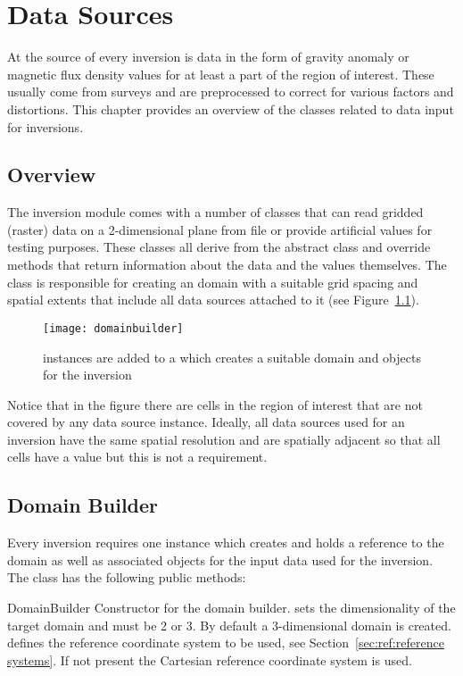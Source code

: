 \chapter{Data Sources}\label{Chp:ref:data sources}

At the source of every inversion is data in the form of gravity anomaly or
magnetic flux density values for at least a part of the region of interest.
These usually come from surveys and are preprocessed to correct for various
factors and distortions.
This chapter provides an overview of the classes related to data input for
inversions.

\section{Overview}
The inversion module comes with a number of classes that can read gridded
(raster) data on a 2-dimensional plane from file or provide artificial values
for testing purposes. These classes all derive from the abstract
 class and override methods that return information about
the data and the values themselves.
The  class is responsible for creating an \escript domain
with a suitable grid spacing and spatial extents that include all data sources
attached to it (see Figure~\ref{fig:domainBuilder}).
%
\begin{figure}[ht]
    \centering\texttt{[image: domainbuilder]}
    \caption{ instances are added to a 
        which creates a suitable domain and \Data objects for the inversion}
    \label{fig:domainBuilder}
\end{figure}
%
Notice that in the figure there are cells in the region of interest that are
not covered by any data source instance.
Ideally, all data sources used for an inversion have the same spatial resolution
and are spatially adjacent so that all cells have a value but this is not a
requirement.


\section{Domain Builder}\label{Chp:ref:domain builder}
Every inversion requires one  instance which creates and
holds a reference to the \escript domain as well as associated \Data objects for
the input data used for the inversion.
The class has the following public methods:

\begin{classdesc}{DomainBuilder}{}
Constructor for the domain builder.  sets the dimensionality of the
target domain and must be 2 or 3. By default a 3-dimensional domain is created.
 defines the reference coordinate system to be used, see Section~\ref{sec:ref:reference systems}.
If not present the Cartesian reference coordinate system is used.
\end{classdesc}

